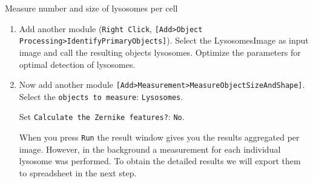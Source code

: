 \begin{taskbox}{Measure number and size of lysosomes per cell}
\begin{enumerate}
Press the \texttt{Run} button again to check your results. Explore the additional settings in the
IdentifySecondaryObjects module and try to improve the segmentation (We want to segment the
complete cells here, not just the mitochondria) (cf. Fig. \ref{fig:cpIdentifySecondary}).

	\begin{minipage}[t]{\linewidth}
		\begin{center}
		\medskip
		\label{fig:cpIdentifySecondary}
		\end{center}
	\end{minipage}

\item Add another module (\texttt{Right Click}, \texttt{[Add>Object Processing>IdentifyPrimaryObjects]}). Select the
LysosomesImage as input image and call the resulting objects lysosomes. Optimize the parameters for
optimal detection of lysosomes.

\item Now add another module \texttt{[Add>Measurement>MeasureObjectSizeAndShape]}. Select the \newline
\texttt{objects to measure}: \texttt{Lysosomes}. 

Set \texttt{Calculate the Zernike features?}: \texttt{No}. 

When you press \texttt{Run} the result window gives you the results aggregated per image. However, in the background a measurement for each
individual lysosome was performed. To obtain the detailed results we will export them to spreadsheet in
the next step.


\end{enumerate}
\end{taskbox}

